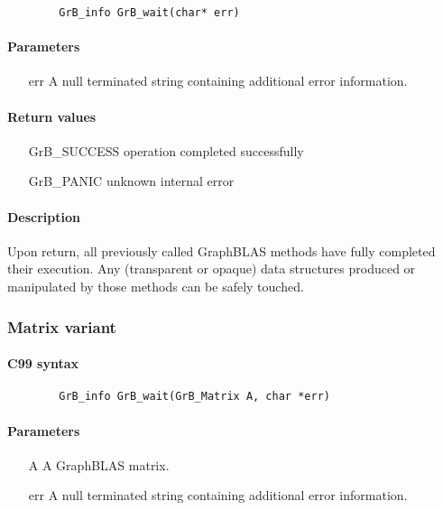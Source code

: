 \begin{verbatim}
        GrB_info GrB_wait(char* err)
\end{verbatim}

\paragraph{Parameters}
\begin{itemize}[leftmargin=1.1in]
\item[{\sf err}]     A null terminated string containing additional error
information.
\end{itemize}


\paragraph{Return values}
\begin{itemize}[leftmargin=2.1in]
\item[{\sf GrB\_SUCCESS}]	operation completed successfully
\item[{\sf GrB\_PANIC}]		unknown internal error
\end{itemize}

\paragraph{Description}

Upon return, all previously called GraphBLAS methods have fully completed their execution.
Any (transparent or opaque) data structures produced or manipulated by those methods can be safely touched.

\subsubsection{Matrix variant}

\paragraph{C99 syntax}

\begin{verbatim}
        GrB_info GrB_wait(GrB_Matrix A, char *err)
\end{verbatim}

\paragraph{Parameters}

\begin{itemize}[leftmargin=1.1in]
        \item[{\sf A}]	   A GraphBLAS matrix.
        \item[{\sf err}]   A null terminated string containing additional error
information.
\end{itemize}

